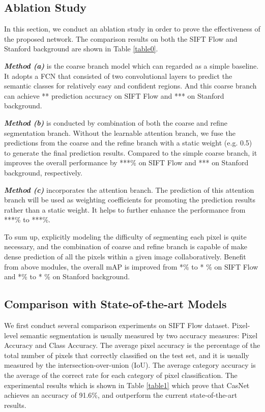 \documentclass[10.5pt,compsoc]{TsT}
\theoremstyle{mystyle}
\begin{document}
\subsection{Ablation Study}
\label{s:ablation}
\noindent

In this section, we conduct an ablation study in order to prove the effectiveness of the proposed network. The comparison results on both the SIFT Flow and Stanford background are shown in Table \ref{table0}.

\textbf{\emph{Method (a)}} is the coarse branch model which can regarded as a simple baseline. It adopts a FCN that consisted of two convolutional layers to predict the semantic classes for relatively easy and confident regions. And this coarse branch can achieve ** prediction accuracy on SIFT Flow and *** on Stanford background.

\textbf{\emph{Method (b)}} is conducted by combination of both the coarse and refine segmentation branch. Without the learnable attention branch, we fuse the predictions from the coarse and the refine branch with a static weight (e.g. 0.5) to generate the final prediction results. Compared to the simple coarse branch, it improves the overall performance by ***\% on SIFT Flow and *** on Stanford background, respectively.

\textbf{\emph{Method (c)}} incorporates the attention branch. The prediction of this attention branch will be used as weighting coefficients for  promoting the prediction results rather than a static weight. It helps to further enhance the performance from ***\% to ***\%.

To sum up, explicitly modeling the difficulty of segmenting each pixel is quite necessary, and the combination of coarse and refine branch is capable of make dense prediction of all the pixels within a given image collaboratively. Benefit from above modules, the overall mAP is improved from *\% to * \% on SIFT Flow and *\% to * \% on Stanford background.

\subsection{Comparison with State-of-the-art Models}
\label{s:comparison}
\noindent

We first conduct several comparison experiments on SIFT Flow dataset. Pixel-level semantic segmentation is usually measured by two accuracy measures: Pixel Accuracy and Class Accuracy. The average pixel accuracy is the percentage of the total number of pixels that correctly classified on the test set, and it is usually measured by the intersection-over-union (IoU). The average category accuracy is the average of the correct rate for each category of pixel classification. The experimental results which is shown in Table \ref{table1} which prove that CasNet achieves an accuracy of 91.6\%, and outperform the current state-of-the-art results.
\end{document}
